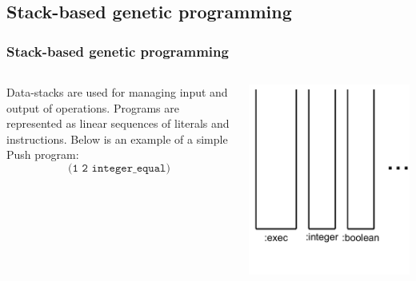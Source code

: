\documentclass{beamer}
\newcommand{\linespace}{\vskip 0.25cm}
\begin{document}
\subsection{Stack-based genetic programming}
\begin{frame}
	\frametitle{Stack-based genetic programming}
	\begin{columns}
		\begin{column}{0.6\textwidth}
			Data-stacks are used for managing input and output of operations.
			\linespace
			\linespace
			\linespace
			\pause Programs are represented as linear sequences of literals and instructions. Below is an example of a simple Push program:
			\[\texttt{(1 2 integer\_equal)}\]
		\end{column}
	\begin{column}{0.4\textwidth}
		\pause[0] \includegraphics[height=1.2\textwidth]{Illustrations/empty_stacks.PDF}
	\end{column}
	\end{columns}
\end{frame}
\end{document}
